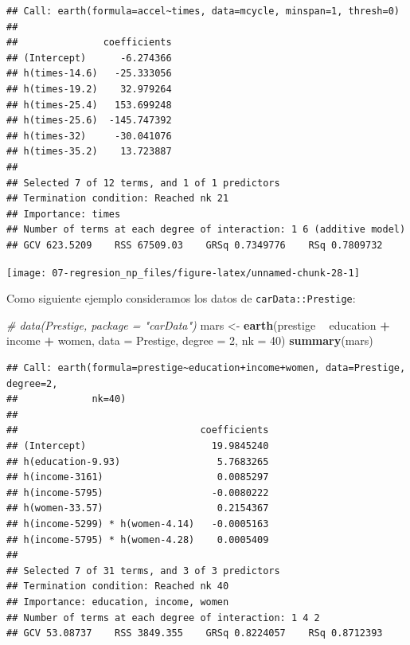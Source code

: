 \documentclass[
]{book}
\newenvironment{Shaded}{\begin{snugshade}}{\end{snugshade}}
\newcommand{\CommentTok}[1]{\textcolor[rgb]{0.56,0.35,0.01}{\textit{#1}}}
\newcommand{\DataTypeTok}[1]{\textcolor[rgb]{0.13,0.29,0.53}{#1}}
\newcommand{\DecValTok}[1]{\textcolor[rgb]{0.00,0.00,0.81}{#1}}
\newcommand{\KeywordTok}[1]{\textcolor[rgb]{0.13,0.29,0.53}{\textbf{#1}}}
\newcommand{\NormalTok}[1]{#1}
\newcommand{\OperatorTok}[1]{\textcolor[rgb]{0.81,0.36,0.00}{\textbf{#1}}}
\newcommand{\StringTok}[1]{\textcolor[rgb]{0.31,0.60,0.02}{#1}}
\theoremstyle{break}
\theoremstyle{definition}
\theoremstyle{definition}
\theoremstyle{definition}
\theoremstyle{remark}
\begin{document}
\begin{verbatim}
## Call: earth(formula=accel~times, data=mcycle, minspan=1, thresh=0)
## 
##               coefficients
## (Intercept)      -6.274366
## h(times-14.6)   -25.333056
## h(times-19.2)    32.979264
## h(times-25.4)   153.699248
## h(times-25.6)  -145.747392
## h(times-32)     -30.041076
## h(times-35.2)    13.723887
## 
## Selected 7 of 12 terms, and 1 of 1 predictors
## Termination condition: Reached nk 21
## Importance: times
## Number of terms at each degree of interaction: 1 6 (additive model)
## GCV 623.5209    RSS 67509.03    GRSq 0.7349776    RSq 0.7809732
\end{verbatim}

\begin{Shaded}
\end{Shaded}

\begin{center}\texttt{[image: 07-regresion\_np\_files/figure-latex/unnamed-chunk-28-1]} \end{center}

Como siguiente ejemplo consideramos los datos de \texttt{carData::Prestige}:

\begin{Shaded}
\begin{Highlighting}[]
\CommentTok{# data(Prestige, package = "carData")}
\NormalTok{mars <-}\StringTok{ }\KeywordTok{earth}\NormalTok{(prestige }\OperatorTok{~}\StringTok{ }\NormalTok{education }\OperatorTok{+}\StringTok{ }\NormalTok{income }\OperatorTok{+}\StringTok{ }\NormalTok{women, }\DataTypeTok{data =}\NormalTok{ Prestige,}
              \DataTypeTok{degree =} \DecValTok{2}\NormalTok{, }\DataTypeTok{nk =} \DecValTok{40}\NormalTok{)}
\KeywordTok{summary}\NormalTok{(mars)}
\end{Highlighting}
\end{Shaded}

\begin{verbatim}
## Call: earth(formula=prestige~education+income+women, data=Prestige, degree=2,
##             nk=40)
## 
##                                coefficients
## (Intercept)                      19.9845240
## h(education-9.93)                 5.7683265
## h(income-3161)                    0.0085297
## h(income-5795)                   -0.0080222
## h(women-33.57)                    0.2154367
## h(income-5299) * h(women-4.14)   -0.0005163
## h(income-5795) * h(women-4.28)    0.0005409
## 
## Selected 7 of 31 terms, and 3 of 3 predictors
## Termination condition: Reached nk 40
## Importance: education, income, women
## Number of terms at each degree of interaction: 1 4 2
## GCV 53.08737    RSS 3849.355    GRSq 0.8224057    RSq 0.8712393
\end{verbatim}
\end{document}

